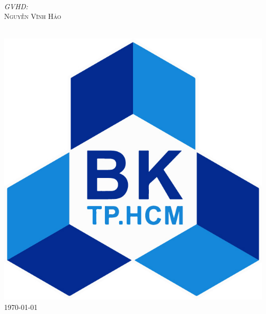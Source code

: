 \documentclass[a4paper, 12pt]{article}
\begin{document}
\begin{titlepage}
\begin{minipage}{0.4\textwidth}
\begin{flushleft}
\end{flushleft}
\end{minipage}
~
\begin{minipage}{0.4\textwidth}
\begin{flushright} \large
\emph{GVHD:} \\
\textsc{Nguyễn Vĩnh Hảo} %
\end{flushright}
\end{minipage}\\[1cm]


\includegraphics[scale=0.25]{images/LogoBK.jpg}\\[1cm] %

{\large \today}\\[0cm] %

\vfill %
\end{titlepage}
\end{document}
